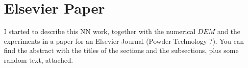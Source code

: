 
\section{Elsevier Paper}
\label{sec:elsevierpaper}

I started to describe this NN work, together with the numerical $DEM$ and the experiments in a paper for an Elsevier Journal (Powder Technology ?).
You can find the abstract with the titles of the sections and the subsections, plus some random text, attached.\\